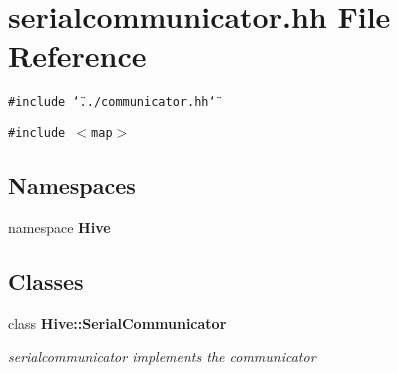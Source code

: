 \section{serialcommunicator.hh File Reference}
\label{serialcommunicator_8hh}


{\tt \#include \char`\"{}../communicator.hh\char`\"{}}\par
{\tt \#include $<$map$>$}\par
\subsection*{Namespaces}
\begin{CompactItemize}
\item 
namespace {\bf Hive}
\end{CompactItemize}
\subsection*{Classes}
\begin{CompactItemize}
\item 
class {\bf Hive::SerialCommunicator}
\begin{CompactList}\small\item\em serialcommunicator implements the communicator \item\end{CompactList}\end{CompactItemize}

